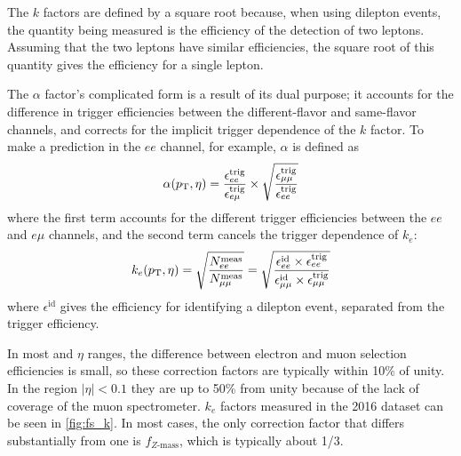 The $k$ factors are defined by a square root because, when using dilepton events, the quantity being measured is the efficiency of the detection of two leptons. Assuming that the two leptons have similar efficiencies, the square root of this quantity gives the efficiency for a single lepton. 

The $\alpha$ factor's complicated form is a result of its dual purpose; it accounts for the difference in trigger efficiencies between the different-flavor and same-flavor channels, and corrects for the implicit trigger dependence of the $k$ factor. To make a prediction in the $ee$ channel, for example, $\alpha$ is defined as
%
\begin{equation}
\alpha(p_{\text{T}}, \eta) = \frac{\epsilon^\text{trig}_{ee}}{\epsilon^\text{trig}_{e\mu}} \times \sqrt{ \frac{\epsilon^\text{trig}_{\mu\mu}}{\epsilon^\text{trig}_{ee}} }
\end{equation}
%
where the first term accounts for the different trigger efficiencies between the $ee$ and $e\mu$ channels, and the second term cancels the trigger dependence of $k_e$:
%
\begin{equation}
k_{e}(p_{\text{T}}, \eta) = \sqrt{\frac{N_{ee}^{\text{meas}}}{N_{\mu\mu}^{\text{meas}}}} = \sqrt{\frac{\epsilon^\text{id}_{ee}\times\epsilon^\text{trig}_{ee}}{\epsilon^\text{id}_{\mu\mu}\times\epsilon^\text{trig}_{\mu\mu}}}
\end{equation}
%
where $\epsilon^\text{id}$ gives the efficiency for identifying a dilepton event, separated from the trigger efficiency. 

In most \pT and $\eta$ ranges, the difference between electron and muon selection efficiencies is small, so these correction factors are typically within 10\% of unity. In the region $|\eta|<0.1$ they are up to 50\% from unity because of the lack of coverage of the muon spectrometer. $k_e$ factors measured in the 2016 dataset can be seen in \autoref{fig:fs_k}. In most cases, the only correction factor that differs substantially from one is $f_{Z \mathrm{\text{-}mass}}$, which is typically about 1/3. 

